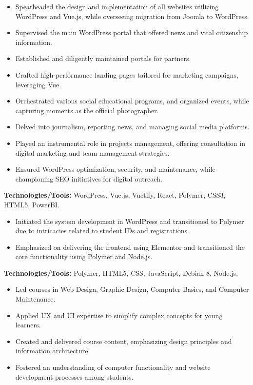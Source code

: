 \documentclass[10pt,a4paper]{altacv}
\begin{document}
\begin{itemize}
    \setlength{\itemindent}{0.5em}
    \item[--] Spearheaded the design and implementation of all websites utilizing WordPress and Vue.js, while overseeing migration from Joomla to WordPress.
    \item[--] Supervised the main WordPress portal that offered news and vital citizenship information.
    \item[--] Established and diligently maintained portals for partners.
    \item[--] Crafted high-performance landing pages tailored for marketing campaigns, leveraging Vue.
    \item[--] Orchestrated various social educational programs, and organized events, while capturing moments as the official photographer.
    \item[--] Delved into journalism, reporting news, and managing social media platforms.
    \item[--] Played an instrumental role in projects management, offering consultation in digital marketing and team management strategies.
    \item[--] Ensured WordPress optimization, security, and maintenance, while championing SEO initiatives for digital outreach.
\end{itemize}
\textbf{Technologies/Tools:} WordPress, Vue.js, Vuetify, React, Polymer, CSS3, HTML5, PowerBI.
\vspace{5mm}

\begin{itemize}
    \setlength{\itemindent}{0.5em}
    \item[--] Initiated the system development in WordPress and transitioned to Polymer due to intricacies related to student IDs and registrations.
    \item[--] Emphasized on delivering the frontend using Elementor and transitioned the core functionality using Polymer and Node.js.
\end{itemize}
\textbf{Technologies/Tools:} Polymer, HTML5, CSS, JavaScript, Debian 8, Node.js.
\vspace{5mm}


\begin{itemize}
    \setlength{\itemindent}{0.5em}
    \item[--] Led courses in Web Design, Graphic Design, Computer Basics, and Computer Maintenance.
    \item[--] Applied UX and UI expertise to simplify complex concepts for young learners.
    \item[--] Created and delivered course content, emphasizing design principles and information architecture.
    \item[--] Fostered an understanding of computer functionality and website development processes among students.
\end{itemize}
\end{document}
